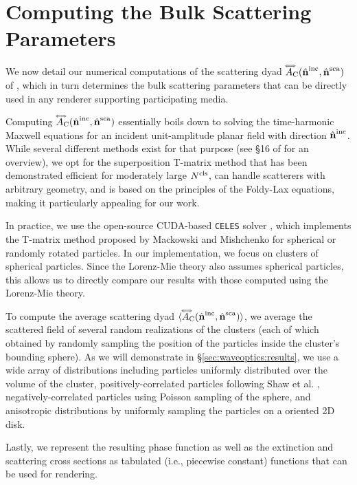 \section{Computing the Bulk Scattering Parameters}
\label{sec:waveoptics:ours_numerical}

We now detail our numerical computations of the scattering dyad ${\accentset{\Longleftrightarrow}{A}}_{\mathrm{C}}({\hat{\mathbf{n}}}^\mathrm{inc},{\hat{\mathbf{n}}}^\mathrm{sca})$ of , which in turn determines the bulk scattering parameters that can be directly used in any renderer supporting participating media. 

Computing ${\accentset{\Longleftrightarrow}{A}}_{\mathrm{C}}({\hat{\mathbf{n}}}^\mathrm{inc},{\hat{\mathbf{n}}}^\mathrm{sca})$ essentially boils down to solving the time-harmonic Maxwell equations for an incident unit-amplitude planar field with direction ${\hat{\mathbf{n}}}^\mathrm{inc}$. While several different methods exist for that purpose (see \S 16 of \cite{mishchenko2014electromagnetic} for an overview), we opt for the superposition T-matrix method \cite{mackowski1996calculation} that has been demonstrated efficient for moderately large $N^\mathrm{cls}$, can handle scatterers with arbitrary geometry, and is based on the principles of the Foldy-Lax equations, making it particularly appealing for our work. 

In practice, we use the open-source CUDA-based \texttt{CELES} solver \cite{egel2017celes}, which implements the T-matrix method proposed by Mackowski and Mishchenko \cite{mackowski2011multiple} for spherical or randomly rotated particles.
In our implementation, we focus on clusters of spherical particles.
Since the Lorenz-Mie theory also assumes spherical particles, this allows us to directly compare our results with those computed using the Lorenz-Mie theory. 

To compute the average scattering dyad ${\langle {\accentset{\Longleftrightarrow}{A}}_{\mathrm{C}}({\hat{\mathbf{n}}}^\mathrm{inc},{\hat{\mathbf{n}}}^\mathrm{sca}) \rangle}$, we average the scattered field of several random realizations of the clusters (each of which obtained by randomly sampling the position of the particles inside the cluster's bounding sphere).
As we will demonstrate in \S\ref{sec:waveoptics:results}, we use a wide array of distributions including particles uniformly distributed over the volume of the cluster, positively-correlated particles following Shaw et al. \cite{shaw2002super}, negatively-correlated particles using Poisson sampling of the sphere, and anisotropic distributions by uniformly sampling the particles on a oriented 2D disk.

Lastly, we represent the resulting phase function as well as the extinction and scattering cross sections as tabulated (i.e., piecewise constant) functions that can be used for rendering.
